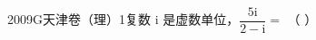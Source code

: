 
\begin{problem}{2009}{G}{天津卷（理）}{1}{复数}
$\mathrm{i}$ 是虚数单位，$\dfrac{5\mathrm{i}}{2-\mathrm{i}}=$ \hspace{1cm} （ ）
\begin{choices}
\end{choices}
\end{problem}

\begin{answer}

\end{answer}

\begin{solutions}

\end{solutions}